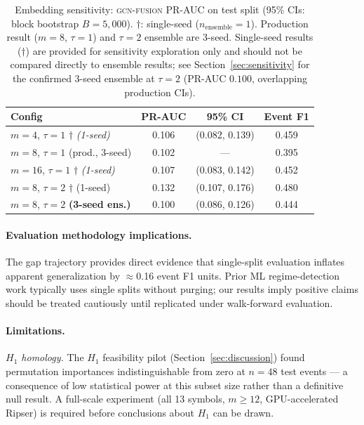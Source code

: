 \documentclass[sigconf]{acmart}
\begin{document}
\begin{table}[t]
\caption{Embedding sensitivity: \textsc{gcn-fusion} PR-AUC on test split
(95\% CIs: block bootstrap $B{=}5{,}000$).
$\dagger$: single-seed ($n_\mathrm{ensemble}{=}1$).
Production result ($m{=}8$, $\tau{=}1$) and $\tau{=}2$ ensemble are 3-seed.
Single-seed results ($\dagger$) are provided for sensitivity exploration only
and should not be compared directly to ensemble results; see
Section~\ref{sec:sensitivity} for the confirmed 3-seed ensemble at $\tau{=}2$
(PR-AUC $0.100$, overlapping production CIs).}
\label{tab:embedding_sensitivity}
\small
\begin{tabular}{@{}lccc@{}}
\toprule
Config & PR-AUC & 95\% CI & Event F1 \\
\midrule
$m{=}4$, $\tau{=}1$ $\dagger$ \textit{(1-seed)}  & 0.106 & (0.082, 0.139) & 0.459 \\
$m{=}8$, $\tau{=}1$ (prod., 3-seed)            & 0.102 & --- & 0.395 \\
$m{=}16$, $\tau{=}1$ $\dagger$ \textit{(1-seed)}& 0.107 & (0.083, 0.142) & 0.452 \\
$m{=}8$, $\tau{=}2$ $\dagger$ (1-seed)          & 0.132 & (0.107, 0.176) & 0.480 \\
$m{=}8$, $\tau{=}2$ \textbf{(3-seed ens.)}      & 0.100 & (0.086, 0.126) & 0.444 \\
\bottomrule
\end{tabular}
\end{table}

\paragraph{Evaluation methodology implications.}
The gap trajectory provides direct evidence that single-split evaluation
inflates apparent generalization by $\approx$0.16 event F1 units.
Prior ML regime-detection work \cite{guo2022regime} typically uses single
splits without purging; our results imply positive claims should be treated
cautiously until replicated under walk-forward evaluation.

\paragraph{Limitations.}
\label{sec:limitations}
\textit{$H_1$ homology.} The $H_1$ feasibility pilot (Section~\ref{sec:discussion})
found permutation importances indistinguishable from zero at $n{=}48$ test
events --- a consequence of low statistical power at this subset size rather
than a definitive null result. A full-scale experiment (all 13 symbols,
$m \geq 12$, GPU-accelerated Ripser) is required before conclusions about
$H_1$ can be drawn.
\end{document}
